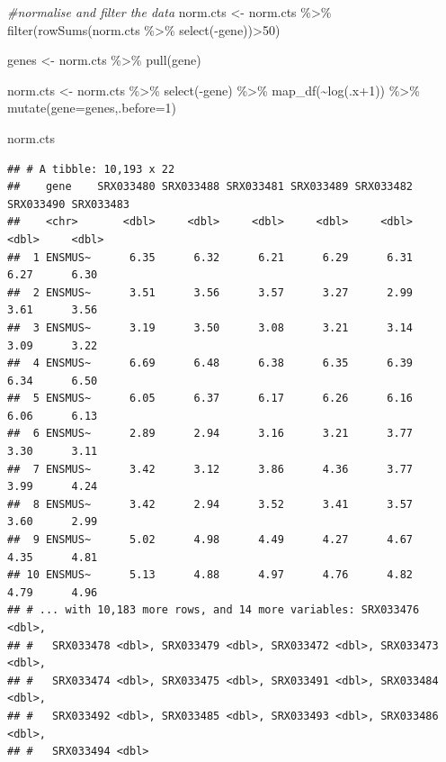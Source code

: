 \documentclass[
]{book}
\newenvironment{Shaded}{\begin{snugshade}}{\end{snugshade}}
\newcommand{\AttributeTok}[1]{\textcolor[rgb]{0.77,0.63,0.00}{#1}}
\newcommand{\CommentTok}[1]{\textcolor[rgb]{0.56,0.35,0.01}{\textit{#1}}}
\newcommand{\DecValTok}[1]{\textcolor[rgb]{0.00,0.00,0.81}{#1}}
\newcommand{\FunctionTok}[1]{\textcolor[rgb]{0.00,0.00,0.00}{#1}}
\newcommand{\NormalTok}[1]{#1}
\newcommand{\OtherTok}[1]{\textcolor[rgb]{0.56,0.35,0.01}{#1}}
\newcommand{\SpecialCharTok}[1]{\textcolor[rgb]{0.00,0.00,0.00}{#1}}
\begin{document}
\begin{Shaded}
\begin{Highlighting}[]
\CommentTok{\#normalise and filter the data}
\NormalTok{norm.cts }\OtherTok{\textless{}{-}}\NormalTok{ norm.cts }\SpecialCharTok{\%\textgreater{}\%} 
  \FunctionTok{filter}\NormalTok{(}\FunctionTok{rowSums}\NormalTok{(norm.cts }\SpecialCharTok{\%\textgreater{}\%} \FunctionTok{select}\NormalTok{(}\SpecialCharTok{{-}}\NormalTok{gene))}\SpecialCharTok{\textgreater{}}\DecValTok{50}\NormalTok{) }

\NormalTok{genes }\OtherTok{\textless{}{-}}\NormalTok{ norm.cts }\SpecialCharTok{\%\textgreater{}\%} \FunctionTok{pull}\NormalTok{(gene)}

\NormalTok{norm.cts }\OtherTok{\textless{}{-}}\NormalTok{ norm.cts }\SpecialCharTok{\%\textgreater{}\%} 
  \FunctionTok{select}\NormalTok{(}\SpecialCharTok{{-}}\NormalTok{gene) }\SpecialCharTok{\%\textgreater{}\%}
  \FunctionTok{map\_df}\NormalTok{(}\SpecialCharTok{\textasciitilde{}}\FunctionTok{log}\NormalTok{(.x}\SpecialCharTok{+}\DecValTok{1}\NormalTok{)) }\SpecialCharTok{\%\textgreater{}\%} 
  \FunctionTok{mutate}\NormalTok{(}\AttributeTok{gene=}\NormalTok{genes,}\AttributeTok{.before=}\DecValTok{1}\NormalTok{)}

\NormalTok{norm.cts}
\end{Highlighting}
\end{Shaded}

\begin{verbatim}
## # A tibble: 10,193 x 22
##    gene    SRX033480 SRX033488 SRX033481 SRX033489 SRX033482 SRX033490 SRX033483
##    <chr>       <dbl>     <dbl>     <dbl>     <dbl>     <dbl>     <dbl>     <dbl>
##  1 ENSMUS~      6.35      6.32      6.21      6.29      6.31      6.27      6.30
##  2 ENSMUS~      3.51      3.56      3.57      3.27      2.99      3.61      3.56
##  3 ENSMUS~      3.19      3.50      3.08      3.21      3.14      3.09      3.22
##  4 ENSMUS~      6.69      6.48      6.38      6.35      6.39      6.34      6.50
##  5 ENSMUS~      6.05      6.37      6.17      6.26      6.16      6.06      6.13
##  6 ENSMUS~      2.89      2.94      3.16      3.21      3.77      3.30      3.11
##  7 ENSMUS~      3.42      3.12      3.86      4.36      3.77      3.99      4.24
##  8 ENSMUS~      3.42      2.94      3.52      3.41      3.57      3.60      2.99
##  9 ENSMUS~      5.02      4.98      4.49      4.27      4.67      4.35      4.81
## 10 ENSMUS~      5.13      4.88      4.97      4.76      4.82      4.79      4.96
## # ... with 10,183 more rows, and 14 more variables: SRX033476 <dbl>,
## #   SRX033478 <dbl>, SRX033479 <dbl>, SRX033472 <dbl>, SRX033473 <dbl>,
## #   SRX033474 <dbl>, SRX033475 <dbl>, SRX033491 <dbl>, SRX033484 <dbl>,
## #   SRX033492 <dbl>, SRX033485 <dbl>, SRX033493 <dbl>, SRX033486 <dbl>,
## #   SRX033494 <dbl>
\end{verbatim}
\end{document}
